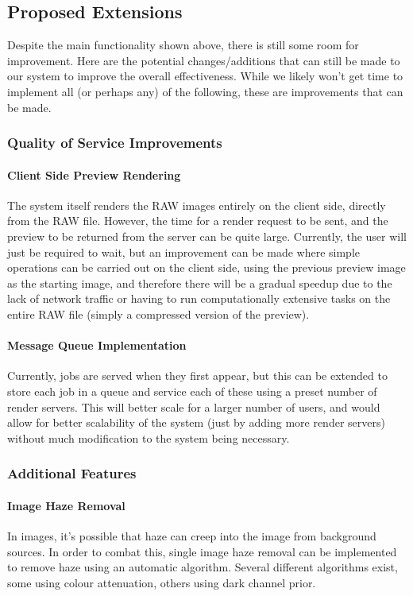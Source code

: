 \documentclass[12pt,a4paper]{article}
\begin{document}
\subsection{Proposed Extensions}
Despite the main functionality shown above, there is still some room for improvement. Here are the potential changes/additions that can still be made to our system to improve the overall effectiveness. While we likely won't get time to implement all (or perhaps any) of the following, these are improvements that can be made.

\subsubsection{Quality of Service Improvements}
\paragraph{Client Side Preview Rendering}
The system itself renders the RAW images entirely on the client side,
directly from the RAW file. However, the time for a render request to be sent, and the preview to be returned from the server can be quite large. Currently, the user will just be required to wait, but an improvement can be made where simple operations can be carried out on the client side, using the previous preview image as the starting image, and therefore there will be a gradual speedup due to the lack of network traffic or having to run computationally extensive tasks on the entire RAW file (simply a compressed version of the preview).

\paragraph{Message Queue Implementation}
Currently, jobs are served when they first appear, but this can be extended to store each job in a queue and service each of these using a preset number of render servers. This will better scale for
a larger number of users, and would allow for better scalability of the system (just by adding more render servers) without
much modification to the system being necessary.

\subsubsection{Additional Features}
\paragraph{Image Haze Removal}
In images, it's possible that haze can creep into the image from background sources. In order to combat this, single image haze removal can be implemented to remove haze using an automatic algorithm. Several different algorithms exist, some using colour attenuation, others using dark channel prior.
\end{document}

